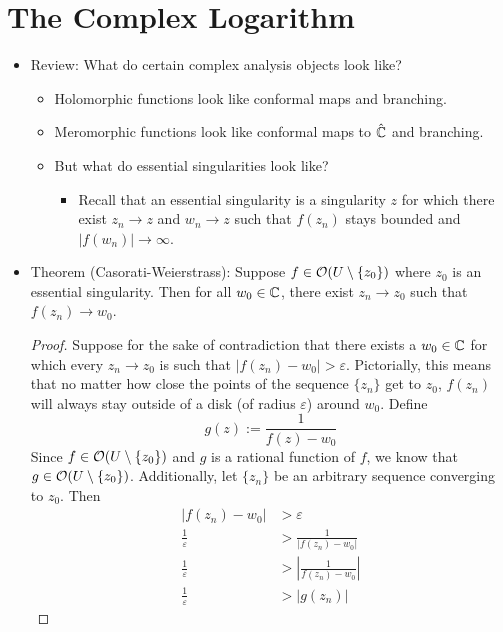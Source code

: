 \documentclass[../notes.tex]{subfiles}
\begin{document}
\section{The Complex Logarithm}
\begin{itemize}
    \item {}Review: What do certain complex analysis objects look like?
    \begin{itemize}
        \item Holomorphic functions look like conformal maps and branching.
        \item Meromorphic functions look like conformal maps to $\hat{\mathbb{C}}$ and branching.
        \item But what do essential singularities look like?
        \begin{itemize}
            \item Recall that an essential singularity is a singularity $z$ for which there exist $z_n\to z$ and $w_n\to z$ such that $f(z_n)$ stays bounded and $|f(w_n)|\to\infty$.
        \end{itemize}
    \end{itemize}
    \item Theorem (Casorati-Weierstrass): Suppose $f\in\mathcal{O}(U\setminus\{z_0\})$ where $z_0$ is an essential singularity. Then for all $w_0\in\mathbb{C}$, there exist $z_n\to z_0$ such that $f(z_n)\to w_0$.
    \begin{proof}
        Suppose for the sake of contradiction that there exists a $w_0\in\mathbb{C}$ for which every $z_n\to z_0$ is such that $|f(z_n)-w_0|>\varepsilon$. Pictorially, this means that no matter how close the points of the sequence $\{z_n\}$ get to $z_0$, $f(z_n)$ will always stay outside of a disk (of radius $\varepsilon$) around $w_0$. Define
        \begin{equation*}
            g(z) := \frac{1}{f(z)-w_0}
        \end{equation*}
        Since $f\in\mathcal{O}(U\setminus\{z_0\})$ and $g$ is a rational function of $f$, we know that $g\in\mathcal{O}(U\setminus\{z_0\})$. Additionally, let $\{z_n\}$ be an arbitrary sequence converging to $z_0$. Then
        \begin{align*}
            |f(z_n)-w_0| &> \varepsilon\\
            \frac{1}{\varepsilon} &> \frac{1}{|f(z_n)-w_0|}\\
            \frac{1}{\varepsilon} &> \left| \frac{1}{f(z_n)-w_0} \right|\\
            \frac{1}{\varepsilon} &> |g(z_n)|

\end{align*}
\end{proof}
\end{itemize}
\end{document}
